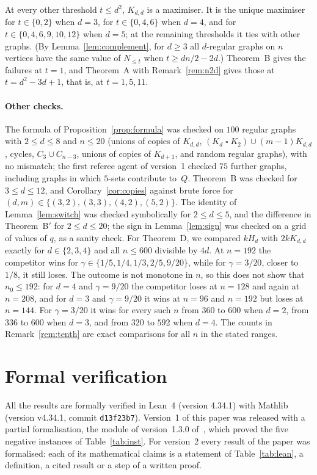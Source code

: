\documentclass[11pt]{article}
\theoremstyle{remark}
\newcommand{\Nle}[1]{N_{\le #1}}
\newcommand{\cart}{\mathbin{\square}}
\begin{document}
At every other threshold $t\le d^2$, $K_{d,d}$ is a maximiser. It is the unique
maximiser for $t\in\{0,2\}$ when $d=3$, for $t\in\{0,4,6\}$ when $d=4$, and
for $t\in\{0,4,6,9,10,12\}$ when $d=5$; at the remaining thresholds it ties
with other graphs. (By Lemma~\ref{lem:complement}, for $d\ge3$ all $d$-regular
graphs on $n$ vertices have the same value of $\Nle t$ when $t\ge dn/2-2d$.)
Theorem~B gives the failures at $t=1$, and Theorem~A with
Remark~\ref{rem:n2d} gives those at $t=d^2-3d+1$, that is, at $t=1,5,11$.

\paragraph{Other checks.}
The formula of Proposition~\ref{prop:formula} was checked on $100$ regular
graphs with $2\le d\le8$ and $n\le20$ (unions of copies of $K_{d,d}$,
$(K_d\cart K_2)\cup(m-1)K_{d,d}$, cycles, $C_3\cup C_{n-3}$, unions of copies
of $K_{d+1}$, and random regular graphs), with no mismatch; the first referee
agent of version~1 checked $75$ further graphs, including graphs in which $5$-sets contribute
to~$Q$. Theorem~B was checked for $3\le d\le12$, and
Corollary~\ref{cor:copies} against brute force for
$(d,m)\in\{(3,2),(3,3),(4,2),(5,2)\}$. The identity of
Lemma~\ref{lem:switch} was checked symbolically for $2\le d\le5$, and the
difference in Theorem~B$'$ for $2\le d\le20$; the sign in
Lemma~\ref{lem:sign} was checked on a grid of values of $q$, as a sanity
check. For Theorem~D, we compared $kH_d$ with $2kK_{d,d}$ exactly for
$d\in\{2,3,4\}$ and all $n\le600$ divisible by $4d$. At $n=192$ the competitor
wins for $\gamma\in\{1/5,1/4,1/3,2/5,9/20\}$, while for $\gamma=3/20$, closer
to $1/8$, it still loses. The outcome is not
monotone in $n$, so this does not show that $n_0\le192$: for $d=4$ and
$\gamma=9/20$ the competitor loses at $n=128$ and again at $n=208$, and for
$d=3$ and $\gamma=9/20$ it wins at $n=96$ and $n=192$ but loses at $n=144$.
For $\gamma=3/20$ it wins for every such $n$ from $360$ to $600$ when $d=2$,
from $336$ to $600$ when $d=3$, and from $320$ to $592$ when $d=4$. The
counts in
Remark~\ref{rem:tenth} are exact comparisons for all $n$ in the stated
ranges.

\section{Formal verification}\label{sec:lean}
All the results are formally verified in Lean~4 (version 4.34.1) with
Mathlib~\cite{mathlib} (version v4.34.1, commit \texttt{d13f23b7}).
Version~1 of this paper was released with a partial formalisation, the module
 of version~1.3.0 of~\cite{repo}, which proved the five
negative instances of Table~\ref{tab:inst}. For version~2 every result of the
paper was formalised: each of its mathematical claims is a statement of
Table~\ref{tab:lean}, a definition, a cited result or a step of a written
proof.
\end{document}
